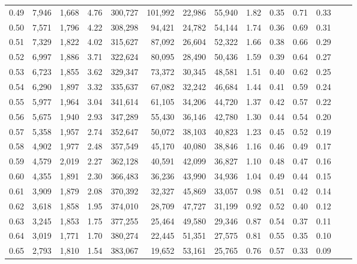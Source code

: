 \begin{tabular}{rrrrrrrrrrrrrr}
0.49 &   7,946 &  1,668 &    4.76 &  300,727 &  101,992 &  22,986 &  55,940 &  1.82 &  0.35 &  0.71 &      0.33 \\
0.50 &   7,571 &  1,796 &    4.22 &  308,298 &   94,421 &  24,782 &  54,144 &  1.74 &  0.36 &  0.69 &      0.31 \\
0.51 &   7,329 &  1,822 &    4.02 &  315,627 &   87,092 &  26,604 &  52,322 &  1.66 &  0.38 &  0.66 &      0.29 \\
0.52 &   6,997 &  1,886 &    3.71 &  322,624 &   80,095 &  28,490 &  50,436 &  1.59 &  0.39 &  0.64 &      0.27 \\
0.53 &   6,723 &  1,855 &    3.62 &  329,347 &   73,372 &  30,345 &  48,581 &  1.51 &  0.40 &  0.62 &      0.25 \\
0.54 &   6,290 &  1,897 &    3.32 &  335,637 &   67,082 &  32,242 &  46,684 &  1.44 &  0.41 &  0.59 &      0.24 \\
0.55 &   5,977 &  1,964 &    3.04 &  341,614 &   61,105 &  34,206 &  44,720 &  1.37 &  0.42 &  0.57 &      0.22 \\
0.56 &   5,675 &  1,940 &    2.93 &  347,289 &   55,430 &  36,146 &  42,780 &  1.30 &  0.44 &  0.54 &      0.20 \\
0.57 &   5,358 &  1,957 &    2.74 &  352,647 &   50,072 &  38,103 &  40,823 &  1.23 &  0.45 &  0.52 &      0.19 \\
0.58 &   4,902 &  1,977 &    2.48 &  357,549 &   45,170 &  40,080 &  38,846 &  1.16 &  0.46 &  0.49 &      0.17 \\
0.59 &   4,579 &  2,019 &    2.27 &  362,128 &   40,591 &  42,099 &  36,827 &  1.10 &  0.48 &  0.47 &      0.16 \\
0.60 &   4,355 &  1,891 &    2.30 &  366,483 &   36,236 &  43,990 &  34,936 &  1.04 &  0.49 &  0.44 &      0.15 \\
0.61 &   3,909 &  1,879 &    2.08 &  370,392 &   32,327 &  45,869 &  33,057 &  0.98 &  0.51 &  0.42 &      0.14 \\
0.62 &   3,618 &  1,858 &    1.95 &  374,010 &   28,709 &  47,727 &  31,199 &  0.92 &  0.52 &  0.40 &      0.12 \\
0.63 &   3,245 &  1,853 &    1.75 &  377,255 &   25,464 &  49,580 &  29,346 &  0.87 &  0.54 &  0.37 &      0.11 \\
0.64 &   3,019 &  1,771 &    1.70 &  380,274 &   22,445 &  51,351 &  27,575 &  0.81 &  0.55 &  0.35 &      0.10 \\
0.65 &   2,793 &  1,810 &    1.54 &  383,067 &   19,652 &  53,161 &  25,765 &  0.76 &  0.57 &  0.33 &      0.09 \\

\end{tabular}
